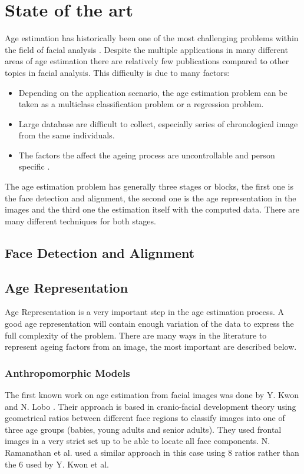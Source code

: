 \chapter{State of the art} \label{chap:sota}

Age estimation has historically been one of the most challenging problems within the field of facial analysis \cite{5406526}\cite{han:age}. Despite the multiple applications in many different areas of age estimation there are relatively few publications compared to other topics in facial analysis. This difficulty is due to many factors: 
\begin{itemize}
	\item Depending on the application scenario, the age estimation problem can be taken as a multiclass classification problem or a regression problem.
	\item Large database are difficult to collect, especially series of chronological image from the same individuals.
	\item The factors the affect the ageing process are uncontrollable and person specific \cite{4284917}\cite{4359348}\cite{1709980}.
\end{itemize}

The age estimation problem has generally three stages or blocks, the first one is the face detection and alignment, the second one is the age representation in the images and the third one the estimation itself with the computed data. There are many different techniques for both stages. \cite{5406526}

\section{Face Detection and Alignment}
\section{Age Representation}

Age Representation is a very important step in the age estimation process. A good age representation will contain enough variation of the data to express the full complexity of the problem. There are many ways in the literature to represent ageing factors from an image, the most important are described below.

\subsection{Anthropomorphic Models}
The first known work on age estimation from facial images was done by Y. Kwon and N. Lobo \cite{Kwon:1999:ACF:311844.311845}. Their approach is based in cranio-facial development theory using geometrical ratios between different face regions to classify images into one of three age groups (babies, young adults and senior adults). They used frontal images in a very strict set up to be able to locate all face components. N. Ramanathan et al. \cite{1640784} used a similar approach in this case using 8 ratios rather than the 6 used by Y. Kwon et al.

